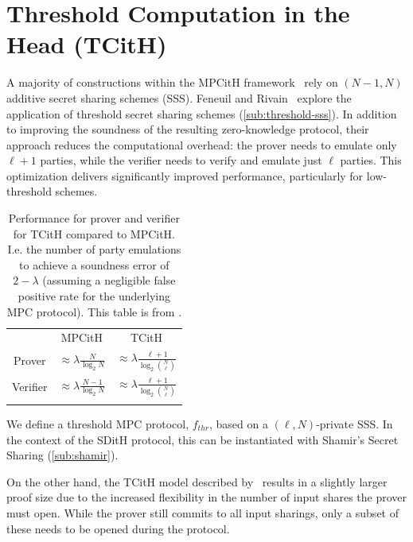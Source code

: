 \documentclass[11pt]{report}
\theoremstyle{definition}
\theoremstyle{plain}
\begin{document}
\section{Threshold Computation in the Head (TCitH)}\label{sec:threshold-mpc}

A majority of constructions within the MPCitH framework~\cite{baum2020concretely,feneuil2022syndrome,katz2018improved} rely on $ (N-1, N) $ additive secret sharing schemes (SSS). Feneuil and Rivain~\cite{feneuil2023threshold,feneuil2023threshold2} explore the application of threshold secret sharing schemes (\autoref{sub:threshold-sss}). In addition to improving the soundness of the resulting zero-knowledge protocol, their approach reduces the computational overhead: the prover needs to emulate only $ \ell + 1 $ parties, while the verifier needs to verify and emulate just $ \ell $ parties. This optimization delivers significantly improved performance, particularly for low-threshold schemes.

\begin{table}[]
  \centering
  \def\arraystretch{1.5}%
  \begin{tabular}{cc|c}
    \textbf{} & MPCitH                                  & TCitH                                                      \\ \arrayrulecolor{darkgray}\hline
    Prover    & $ \approx \lambda \frac{N}{\log_2 N}$   & $ \approx \lambda \frac{\ell + 1}{\log_2 \binom{N}{\ell}}$ \\ \arrayrulecolor{lightgray}\hline
    Verifier  & $ \approx \lambda \frac{N-1}{\log_2 N}$ & $ \approx \lambda \frac{\ell + 1}{\log_2 \binom{N}{\ell}}$ \\ \arrayrulecolor{darkgray}\hline
  \end{tabular}
  \caption{Performance for prover and verifier for TCitH compared to MPCitH. I.e. the number of party emulations to achieve a soundness error of $2-\lambda$ (assuming a negligible false positive rate for the underlying MPC protocol). This table is from \cite{feneuil2023threshold}.}\label{tbl:tcith-performance}
\end{table}

We define a threshold MPC protocol, $ f_{thr} $, based on a $ (\ell, N) $-private SSS. In the context of the SDitH protocol, this can be instantiated with Shamir's Secret Sharing (\autoref{sub:shamir}).

On the other hand, the TCitH model described by~\cite{feneuil2023threshold} results in a slightly larger proof size due to the increased flexibility in the number of input shares the prover must open. While the prover still commits to all input sharings, only a subset of these needs to be opened during the protocol.
\end{document}
